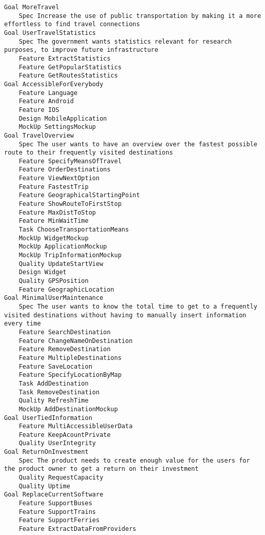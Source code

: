 

\begin{lstlisting}
Goal MoreTravel
	Spec Increase the use of public transportation by making it a more effortless to find travel connections
Goal UserTravelStatistics
	Spec The government wants statistics relevant for research purposes, to improve future infrastructure
	Feature ExtractStatistics
	Feature GetPopularStatistics
	Feature GetRoutesStatistics
Goal AccessibleForEverybody
	Feature Language
	Feature Android
	Feature IOS
	Design MobileApplication
	MockUp SettingsMockup
Goal TravelOverview
	Spec The user wants to have an overview over the fastest possible route to their frequently visited destinations
	Feature SpecifyMeansOfTravel
	Feature OrderDestinations
	Feature ViewNextOption
	Feature FastestTrip
	Feature GeographicalStartingPoint
	Feature ShowRouteToFirstStop
	Feature MaxDistToStop
	Feature MinWaitTime
	Task ChooseTransportationMeans
	MockUp WidgetMockup
	MockUp ApplicationMockup
	MockUp TripInformationMockup
	Quality UpdateStartView
	Design Widget
	Quality GPSPosition
	Feature GeographicLocation
Goal MinimalUserMaintenance
	Spec The user wants to know the total time to get to a frequently visited destinations without having to manually insert information every time
	Feature SearchDestination
	Feature ChangeNameOnDestination
	Feature RemoveDestination
	Feature MultipleDestinations
	Feature SaveLocation
	Feature SpecifyLocationByMap
	Task AddDestination
	Task RemoveDestination
	Quality RefreshTime
	MockUp AddDestinationMockup
Goal UserTiedInformation
	Feature MultiAccessibleUserData
	Feature KeepAcountPrivate
	Quality UserIntegrity
Goal ReturnOnInvestment
	Spec The product needs to create enough value for the users for the product owner to get a return on their investment
	Quality RequestCapacity
	Quality Uptime
Goal ReplaceCurrentSoftware
	Feature SupportBuses
	Feature SupportTrains
	Feature SupportFerries
	Feature ExtractDataFromProviders

\end{lstlisting}